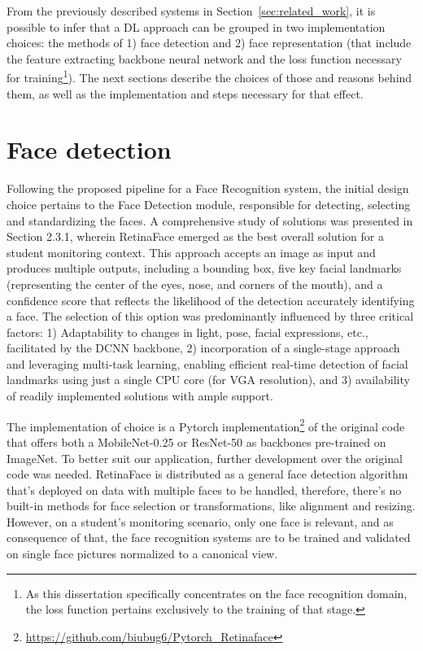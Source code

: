 \documentclass[class=report, crop=false, a4paper, 12pt]{standalone}
\begin{document}
\par From the previously described systems in Section~\ref{sec:related_work}, it is possible to infer that a DL approach can be grouped in two implementation choices: the methods of 1) face detection and 2) face representation (that include the feature extracting backbone neural network and the loss function necessary for training\footnote{As this dissertation specifically concentrates on the face recognition domain, the loss function pertains exclusively to the training of that stage.}). The next sections describe the choices of those and reasons behind them, as well as the implementation and steps necessary for that effect.

\section{Face detection}
\par Following the proposed pipeline for a Face Recognition system, the initial design choice pertains to the Face Detection module, responsible for detecting, selecting and standardizing the faces. A comprehensive study of solutions was presented in Section 2.3.1, wherein RetinaFace emerged as the best overall solution for a student monitoring context. This approach accepts an image as input and produces multiple outputs, including a bounding box, five key facial landmarks (representing the center of the eyes, nose, and corners of the mouth), and a confidence score that reflects the likelihood of the detection accurately identifying a face. The selection of this option was predominantly influenced by three critical factors: 1) Adaptability to changes in light, pose, facial expressions, etc., facilitated by the DCNN backbone, 2) incorporation of a single-stage approach and leveraging multi-task learning, enabling efficient real-time detection of facial landmarks using just a single CPU core (for VGA resolution), and 3) availability of readily implemented solutions with ample support.

\par The implementation of choice is a Pytorch implementation\footnote{\url{https://github.com/biubug6/Pytorch_Retinaface}} of the original code that offers both a MobileNet-0.25 or ResNet-50 as backbones pre-trained on ImageNet. To better suit our application, further development over the original code was needed. RetinaFace is distributed as a general face detection algorithm that's deployed on data with multiple faces to be handled, therefore, there's no built-in methods for face selection or transformations, like alignment and resizing. However, on a student's monitoring scenario, only one face is relevant, and as consequence of that, the face recognition systems are to be trained and validated on single face pictures normalized to a canonical view.
\end{document}
